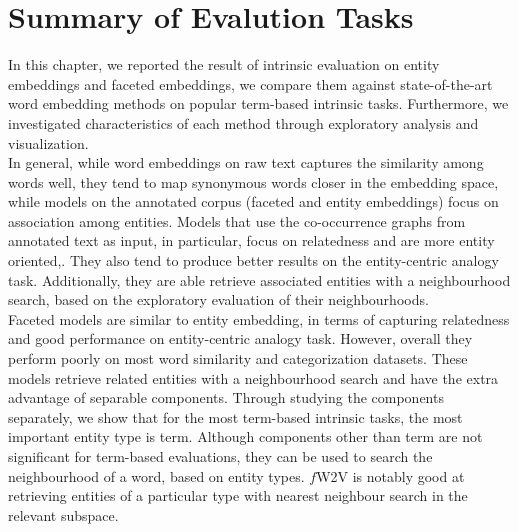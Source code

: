 \section{Summary of Evalution Tasks}\label{sec:eval_summary}
In this chapter, we reported the result of intrinsic evaluation on entity embeddings and faceted embeddings, we compare them against state-of-the-art word embedding methods on popular term-based intrinsic tasks. Furthermore, we investigated characteristics of each method through exploratory analysis and visualization.\\
In general, while word embeddings on raw text captures the similarity among words well, they tend to map synonymous words closer in the embedding space, while models on the annotated corpus (faceted and entity embeddings) focus on association among entities. Models that use the co-occurrence graphs from annotated text as input, in particular, focus on relatedness and are more entity oriented,. They also tend to produce better results on the entity-centric analogy task. Additionally, they are able retrieve associated entities with a neighbourhood search, based on the exploratory evaluation of their neighbourhoods. \\
Faceted models are similar to entity embedding, in terms of capturing relatedness and good performance on entity-centric analogy task. However, overall they perform poorly on most word similarity and categorization datasets. These models retrieve related entities with a neighbourhood search and have the extra advantage of separable components. Through studying the components separately, we show that for the most term-based intrinsic tasks, the most important entity type is term. Although components other than term are not significant for term-based evaluations, they can be used to search the neighbourhood of a word, based on entity types. $f$W2V is notably good at retrieving entities of a particular type with nearest neighbour search in the relevant subspace.
%
%
